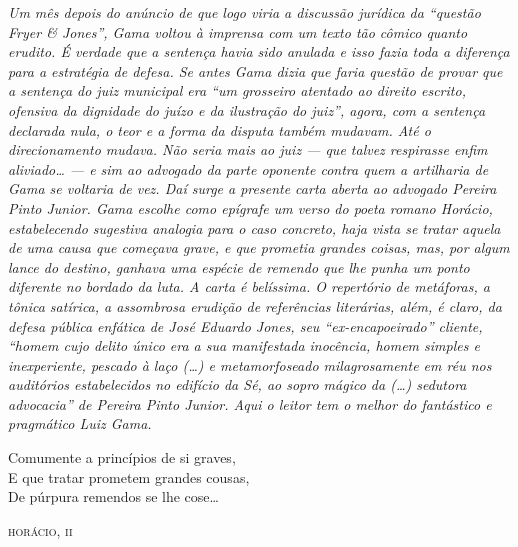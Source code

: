 \begin{didascalia}
\emph{Um mês depois do anúncio de que logo viria a discussão jurídica da
``questão Fryer \& Jones'', Gama voltou à imprensa com um texto tão cômico
quanto erudito. É verdade que a sentença havia sido anulada e isso fazia
toda a diferença para a estratégia de defesa. Se antes Gama dizia que
faria questão de provar que a sentença do juiz municipal era ``um
grosseiro atentado ao direito escrito, ofensiva da dignidade do juízo e
da ilustração do juiz'', agora, com a sentença declarada nula, o teor e a
forma da disputa também mudavam. Até o direcionamento mudava. Não seria
mais ao juiz --- que talvez respirasse enfim aliviado\ldots{} --- e sim ao
advogado da parte oponente contra quem a artilharia de Gama se voltaria
de vez. Daí surge a presente carta aberta ao advogado Pereira Pinto
Junior. Gama escolhe como epígrafe um verso do poeta romano Horácio,
estabelecendo sugestiva analogia para o caso concreto, haja vista se
tratar aquela de uma causa que começava grave, e que prometia grandes
coisas, mas, por algum lance do destino, ganhava uma espécie de remendo
que lhe punha um ponto diferente no bordado da luta. A carta é
belíssima. O repertório de metáforas, a tônica satírica, a assombrosa
erudição de referências literárias, além, é claro, da defesa pública
enfática de José Eduardo Jones, seu ``ex-encapoeirado'' cliente, ``homem
cujo delito único era a sua manifestada inocência, homem simples e
inexperiente, pescado à laço (\ldots{}) e metamorfoseado milagrosamente em
réu nos auditórios estabelecidos no edifício da Sé, ao sopro mágico da
(\ldots{}) sedutora advocacia'' de Pereira Pinto Junior. Aqui o leitor tem o
melhor do fantástico e pragmático Luiz Gama.}
\end{didascalia}

\epigraph{Comumente a princípios de si graves,\\
E que tratar prometem grandes cousas,\\
De púrpura remendos se lhe cose\footnotemark\ldots{}}{\textsc{horácio, ii}\footnotemark}



